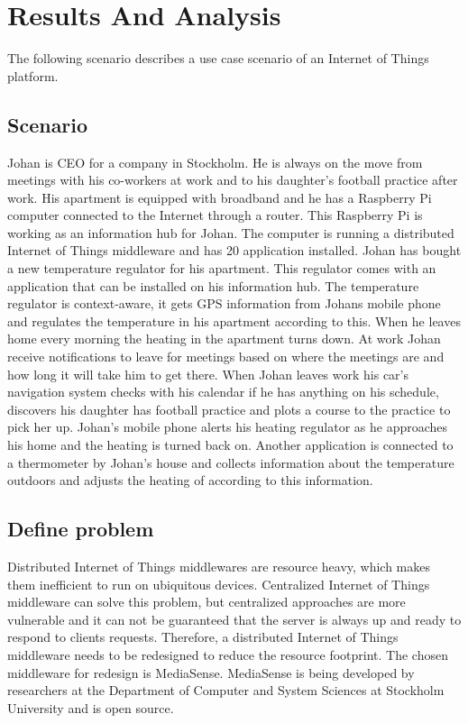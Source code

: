 \section{Results And Analysis}
The following scenario describes a use case scenario of an Internet of Things platform.

\subsection{Scenario}
Johan is CEO for a company in Stockholm. He is always on the move from meetings with his co-workers at work and to his daughter's football practice after work. His apartment is equipped with broadband and he has a Raspberry Pi computer connected to the Internet through a router. This Raspberry Pi is working as an information hub for Johan. The computer is running a distributed Internet of Things middleware and has 20 application installed. Johan has bought a new temperature regulator for his apartment. This regulator comes with an application that can be installed on his information hub. The temperature regulator is context-aware, it gets GPS information from Johans mobile phone and regulates the temperature in his apartment according to this. When he leaves home every morning the heating in the apartment turns down. At work Johan receive notifications to leave for meetings based on where the meetings are and how long it will take him to get there. When Johan leaves work his car's navigation system checks with his calendar if he has anything on his schedule, discovers his daughter has football practice and plots a course to the practice to pick her up. Johan's mobile phone alerts his heating regulator as he approaches his home and the heating is turned back on. Another application is connected to a thermometer by Johan's house and collects information about the temperature outdoors and adjusts the heating of according to this information.

\subsection{Define problem}
Distributed Internet of Things middlewares are resource heavy, which makes them inefficient to run on ubiquitous devices. Centralized Internet of Things middleware can solve this problem, but centralized approaches are more vulnerable and it can not be guaranteed that the server is always up and ready to respond to clients requests. Therefore, a distributed Internet of Things middleware needs to be redesigned to reduce the resource footprint. The chosen middleware for redesign is MediaSense. MediaSense is being developed by researchers at the Department of Computer and System Sciences at Stockholm University and is open source. 

